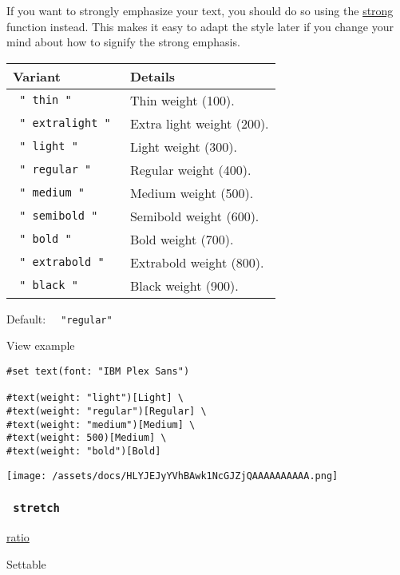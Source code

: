 If you want to strongly emphasize your text, you should do so using the
\href{/docs/reference/model/strong/}{strong} function instead. This
makes it easy to adapt the style later if you change your mind about how
to signify the strong emphasis.

\begin{longtable}[]{@{}ll@{}}
\toprule\noalign{}
Variant & Details \\
\midrule\noalign{}
\endhead
\bottomrule\noalign{}
\endlastfoot
\texttt{\ "\ thin\ "\ } & Thin weight (100). \\
\texttt{\ "\ extralight\ "\ } & Extra light weight (200). \\
\texttt{\ "\ light\ "\ } & Light weight (300). \\
\texttt{\ "\ regular\ "\ } & Regular weight (400). \\
\texttt{\ "\ medium\ "\ } & Medium weight (500). \\
\texttt{\ "\ semibold\ "\ } & Semibold weight (600). \\
\texttt{\ "\ bold\ "\ } & Bold weight (700). \\
\texttt{\ "\ extrabold\ "\ } & Extrabold weight (800). \\
\texttt{\ "\ black\ "\ } & Black weight (900). \\
\end{longtable}

Default: \texttt{\ }{\texttt{\ "regular"\ }}\texttt{\ }


View example

\begin{verbatim}
#set text(font: "IBM Plex Sans")

#text(weight: "light")[Light] \
#text(weight: "regular")[Regular] \
#text(weight: "medium")[Medium] \
#text(weight: 500)[Medium] \
#text(weight: "bold")[Bold]
\end{verbatim}

\texttt{[image: /assets/docs/HLYJEJyYVhBAwk1NcGJZjQAAAAAAAAAA.png]}

\subsubsection{\texorpdfstring{\texttt{\ stretch\ }}{ stretch }}\label{parameters-stretch}

\href{/docs/reference/layout/ratio/}{ratio}

{{ Settable }}

